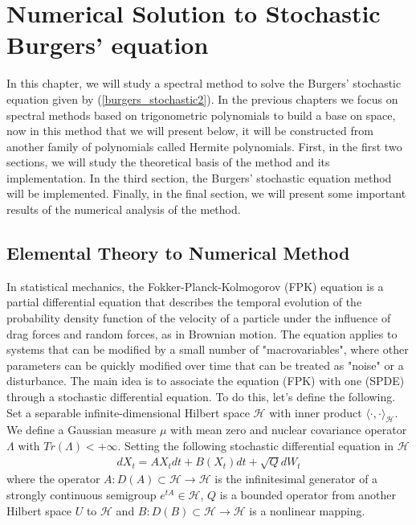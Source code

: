 \chapter{Numerical Solution to Stochastic Burgers' equation}
\label{Chapter_4}
	
	In this chapter, we will study a spectral method to solve the Burgers' stochastic equation given by (\ref {burgers_stochastic2}). In the previous chapters we focus on spectral methods based on trigonometric polynomials to build a base on space, now in this method that we will present below, it will be constructed from another family of polynomials called Hermite polynomials. First, in the first two sections, we will study the theoretical basis of the method and its implementation. In the third section, the Burgers' stochastic equation method will be implemented. Finally, in the final section, we will present some important results of the numerical analysis of the method.\\
		
\section{Elemental Theory to Numerical Method}

	In statistical mechanics, the Fokker-Planck-Kolmogorov (FPK) equation is a partial differential equation that describes the temporal evolution of the probability density function of the velocity of a particle under the influence of drag forces and random forces, as in Brownian motion. The equation applies to systems that can be modified by a small number of "macrovariables", where other parameters can be quickly modified over time that can be treated as "noise" or a disturbance. The main idea is to associate the equation (FPK) with one (SPDE) through a stochastic differential equation. To do this, let's define the following. \\
	
	Set a separable infinite-dimensional Hilbert space $\mathcal{H}$ with inner product $\langle \cdot , \cdot \rangle_{\mathcal{H}}$. We define a Gaussian measure $\mu$ with mean zero and nuclear covariance operator $\Lambda$ with $Tr(\Lambda) < +\infty$. Setting the following stochastic differential equation in $\mathcal{H}$
   	\begin{align}
    	dX_t = AX_t dt + B(X_t) dt + \sqrt{Q} dW_t
    	\label{stochastic_equation}
   	\end{align}
   	where the operator $A : D(A) \subset \mathcal{H} \rightarrow \mathcal{H}$ is the infinitesimal generator of a strongly continuous semigroup $e^{tA} \in \mathcal{H}$, $Q$ is a bounded operator from another Hilbert space $U$ to $\mathcal{H}$ and $B : D(B) \subset \mathcal{H} \rightarrow \mathcal{H}$ is a nonlinear mapping.\\
   	
